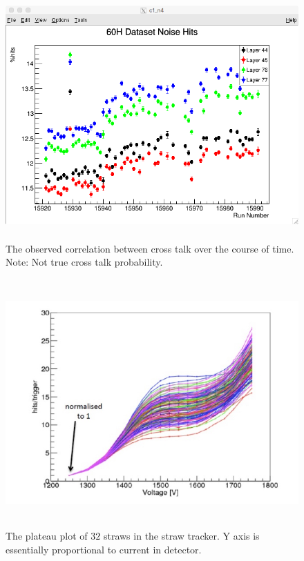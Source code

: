\documentclass[./Thesis]{subfiles}
\begin{document}
\begin{figure}
	\centerline{\includegraphics[height=95mm]{Noise60hDataSet.png}}
	\caption[ Cross Talk Vs. RunNumber ]{ The observed correlation between cross talk over the course of time. Note: Not true cross talk probability.}
	\label{fig:NoiseRun}
\end{figure}

\begin{figure}
	\centerline{\includegraphics[height=95mm]{PlateauCurve.jpeg}}
	\caption[Plateau Plot ]{ The plateau plot of $32$ straws in the straw tracker. Y axis is essentially proportional to current in detector.}
	\label{fig:plateau}
\end{figure}
\end{document}

